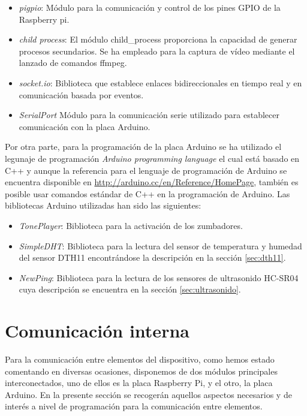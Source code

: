 \begin{itemize}
 \item \emph{pigpio}: Módulo para la comunicación y control de los pines GPIO de la Raspberry pi.
 \item \emph{child process}: El módulo child\_process proporciona la capacidad de generar procesos secundarios. Se ha empleado para la captura de vídeo mediante el lanzado de comandos ffmpeg.
 \item \emph{socket.io}: Biblioteca que establece enlaces bidireccionales en tiempo real y en comunicación basada por eventos.
 \item \emph{SerialPort} Módulo para la comunicación serie utilizado para establecer comunicación con la placa Arduino.
\end{itemize}


Por otra parte, para la programación de la placa Arduino se ha utilizado el legunaje de programación \emph{Arduino programming language} el cual está basado en C++ y aunque 
la referencia para el lenguaje de programación de Arduino se encuentra disponible en \url{http://arduino.cc/en/Reference/HomePage}, también es posible usar comandos estándar de C++ en la
programación de Arduino. Las bibliotecas Arduino utilizadas han sido las siguientes:\\

\begin{itemize}
 \item \emph{TonePlayer}: Biblioteca para la activación de los zumbadores.
 \item \emph{SimpleDHT}: Biblioteca para la lectura del sensor de temperatura y humedad del sensor DTH11 encontrándose la descripción en la sección \ref{sec:dth11}.
 \item \emph{NewPing}: Biblioteca para la lectura de los sensores de ultrasonido HC-SR04 cuya descripción se encuentra en la sección \ref{sec:ultrasonido}.
\end{itemize}


\section{Comunicación interna}

Para la comunicación entre elementos del dispositivo, como hemos estado comentando en diversas ocasiones, disponemos de dos módulos principales interconectados, uno de ellos es 
la placa Raspberry Pi, y el otro, la placa Arduino. En la presente sección se recogerán aquellos aspectos necesarios y de interés a nivel de programación para la comunicación entre elementos.\\

